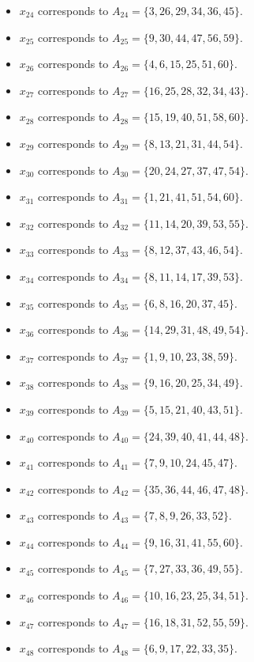 \documentclass[11pt]{article}
\begin{document}
\begin{itemize}
\item $x_{24}$ corresponds to $A_{24}=\{3, 26, 29, 34, 36, 45\}$.
\item $x_{25}$ corresponds to $A_{25}=\{9, 30, 44, 47, 56, 59\}$.
\item $x_{26}$ corresponds to $A_{26}=\{4, 6, 15, 25, 51, 60\}$.
\item $x_{27}$ corresponds to $A_{27}=\{16, 25, 28, 32, 34, 43\}$.
\item $x_{28}$ corresponds to $A_{28}=\{15, 19, 40, 51, 58, 60\}$.
\item $x_{29}$ corresponds to $A_{29}=\{8, 13, 21, 31, 44, 54\}$.
\item $x_{30}$ corresponds to $A_{30}=\{20, 24, 27, 37, 47, 54\}$.
\item $x_{31}$ corresponds to $A_{31}=\{1, 21, 41, 51, 54, 60\}$.
\item $x_{32}$ corresponds to $A_{32}=\{11, 14, 20, 39, 53, 55\}$.
\item $x_{33}$ corresponds to $A_{33}=\{8, 12, 37, 43, 46, 54\}$.
\item $x_{34}$ corresponds to $A_{34}=\{8, 11, 14, 17, 39, 53\}$.
\item $x_{35}$ corresponds to $A_{35}=\{6, 8, 16, 20, 37, 45\}$.
\item $x_{36}$ corresponds to $A_{36}=\{14, 29, 31, 48, 49, 54\}$.
\item $x_{37}$ corresponds to $A_{37}=\{1, 9, 10, 23, 38, 59\}$.
\item $x_{38}$ corresponds to $A_{38}=\{9, 16, 20, 25, 34, 49\}$.
\item $x_{39}$ corresponds to $A_{39}=\{5, 15, 21, 40, 43, 51\}$.
\item $x_{40}$ corresponds to $A_{40}=\{24, 39, 40, 41, 44, 48\}$.
\item $x_{41}$ corresponds to $A_{41}=\{7, 9, 10, 24, 45, 47\}$.
\item $x_{42}$ corresponds to $A_{42}=\{35, 36, 44, 46, 47, 48\}$.
\item $x_{43}$ corresponds to $A_{43}=\{7, 8, 9, 26, 33, 52\}$.
\item $x_{44}$ corresponds to $A_{44}=\{9, 16, 31, 41, 55, 60\}$.
\item $x_{45}$ corresponds to $A_{45}=\{7, 27, 33, 36, 49, 55\}$.
\item $x_{46}$ corresponds to $A_{46}=\{10, 16, 23, 25, 34, 51\}$.
\item $x_{47}$ corresponds to $A_{47}=\{16, 18, 31, 52, 55, 59\}$.
\item $x_{48}$ corresponds to $A_{48}=\{6, 9, 17, 22, 33, 35\}$.

\end{itemize}
\end{document}
